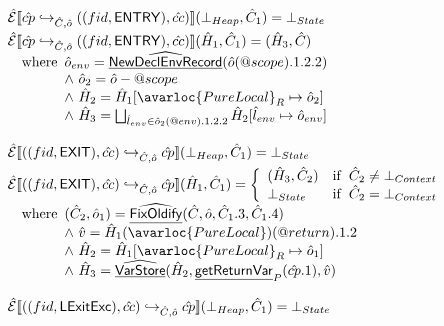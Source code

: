 \[
\begin{array}{l}
\aE \lbr \acp \cfgnext_{\hat{C},\hat{o}} ((fid,\SF{ENTRY}),\hat{cc}) \rbr (\bot_{Heap},\hat{C}_1) = \bot_{State}
\vspace{1mm}\\

\aE \lbr \acp \cfgnext_{\hat{C},\hat{o}} ((fid,\SF{ENTRY}),\hat{cc}) \rbr (\hat{H}_1,\hat{C}_1) = (\hat{H}_3,\hat{C}) \\
  \quad\wherec{
    \hat{o}_{env} = \ahf{NewDeclEnvRecord}(\hat{o}(\varprop{scope}).1.2.2) \\
    \land\ \hat{o}_2 = \hat{o} - \varprop{scope} \\
    \land\ \hat{H}_2 = \hat{H}_1[\avarloc{PureLocal}_R \mapsto \hat{o}_2] \\
    \land\ \hat{H}_3 = \bigsqcup_{\hat{l}_{env}\in\hat{o}_2(\varprop{env}).1.2.2} \hat{H}_2[\hat{l}_{env} \mapsto \hat{o}_{env}]
  }
\\\\

\aE \lbr ((fid,\SF{EXIT}),\hat{cc}) \cfgnext_{\hat{C},\hat{o}} \acp \rbr (\bot_{Heap},\hat{C}_1) = \bot_{State} 
\vspace{1mm}\\

\aE \lbr ((fid,\SF{EXIT}),\hat{cc}) \cfgnext_{\hat{C},\hat{o}} \acp \rbr (\hat{H}_1,\hat{C}_1) =
  \left\{
    \begin{array}{ll}
      (\hat{H}_3, \hat{C}_2) & \ifc{\hat{C}_2 \neq \bot_{Context}} \\
      \bot_{State} & \ifc{\hat{C}_2 = \bot_{Context}} \\
    \end{array}
  \right.\\
  \quad\wherec{
    (\hat{C}_2, \hat{o}_1) = \ahf{FixOldify}(\hat{C}, \hat{o}, \hat{C}_1.3, \hat{C}_1.4) \\ 
    \land\ \hat{v} = \hat{H}_1(\avarloc{PureLocal})(\varprop{return}).1.2 \\
    \land\ \hat{H}_2 = \hat{H}_1[\avarloc{PureLocal}_R \mapsto \hat{o}_1] \\
    \land\ \hat{H}_3 = \ahf{VarStore}(\hat{H}_2, \chf{getReturnVar}_P(\acp.1), \hat{v})
  }
\\\\

\aE \lbr ((fid,\SF{LExitExc}),\hat{cc}) \cfgnext_{\hat{C},\hat{o}} \acp \rbr (\bot_{Heap},\hat{C}_1) = \bot_{State}
\vspace{1mm}\\


\end{array}\]
